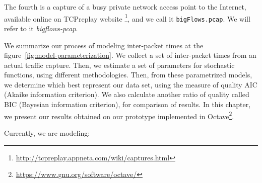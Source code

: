 The fourth is a capture of a busy private network access point to the Internet, available online on TCPreplay website \footnote{ \href{http://tcpreplay.appneta.com/wiki/captures.html}{http://tcpreplay.appneta.com/wiki/captures.html}}, and we call it \texttt{bigFlows.pcap}. We will refer to it \textit{bigflows-pcap}.






We summarize our process of modeling inter-packet times at the figure~\ref{fig:model-parameterization}. We collect a set of inter-packet times from an actual traffic capture. Then, we estimate a set of parameters for stochastic functions, using different methodologies. Then, from these parametrized models, we determine which best represent our data set, using the measure of quality AIC (Akaike information criterion). We also calculate another ratio of quality called BIC (Bayesian information criterion), for comparison of results. In this chapter, we present our results obtained on our prototype implemented in Octave\footnote{ \href{https://www.gnu.org/software/octave/}{https://www.gnu.org/software/octave/}}. 

Currently, we are modeling:

